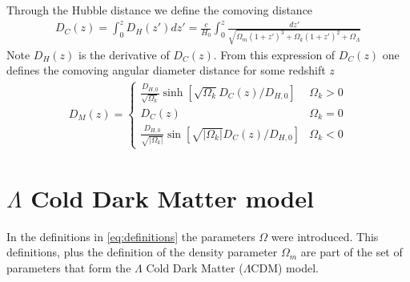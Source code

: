 Through the Hubble distance we define the comoving distance 
\begin{align}
	D_C(z) = \int_{0}^{z} D_H(z') dz' = \frac{c}{H_0}\int_{0}^{z} \frac{dz'}{\sqrt{\Omega_m(1+z')^3 + \Omega_k(1+z')^2 + \Omega_\Lambda} } 
\end{align}
Note $D_H(z)$ is the derivative of $D_C(z)$. From this expression of $D_C(z)$ one defines the comoving angular diameter distance for some redshift $z$
\begin{align}
	D_M(z) = \begin{cases}
		\frac{D_{H, 0}}{ \sqrt{\Omega_k} }\sinh \left[ \sqrt{\Omega_k} D_C(z) /D_{H,0} \right]  	 &\Omega_k >0\\
		D_C(z)& \Omega_k =  0\\
		\frac{D_{H,0}}{\sqrt{|\Omega_k|}} \sin \left[ \sqrt{|\Omega_k|} D_C(z) /D_{H,0} \right]  	 &\Omega_k <0
		\label{eq:DA-definition}
	\end{cases}
\end{align}

\section{$\Lambda$ Cold Dark Matter model}
\label{sec:LCDM}

In the definitions in \eqref{eq:definitions} the parameters $\Omega$ were introduced. This definitions, plus the definition of the density parameter $\Omega_m$ are part of the set of parameters that form the $\Lambda$ Cold Dark Matter ($\Lambda$CDM) model. \\

